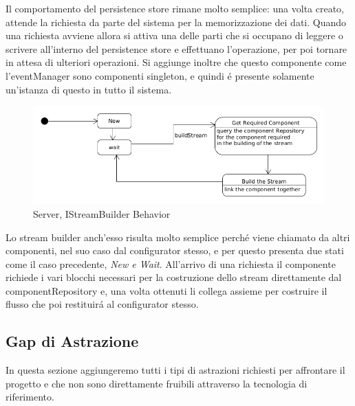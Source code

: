 Il comportamento del persistence store rimane molto semplice: una volta creato, attende la richiesta da parte del sistema per la memorizzazione dei dati.
Quando una richiesta avviene allora si attiva una delle parti che si occupano di leggere o scrivere all'interno del persistence store e effettuano l'operazione, per poi tornare in attesa di ulteriori operazioni. Si aggiunge inoltre che questo componente come l'eventManager sono componenti singleton, e quindi \'e presente solamente un'istanza di questo in tutto il sistema.

\begin{figure}[h]
\centering
\includegraphics[width=\textwidth]{Figures/LogicArchitecture/Server/IStreamBuiderBehavior}
\caption{Server, IStreamBuilder Behavior}
\end{figure}

Lo stream builder anch'esso risulta molto semplice perch\'e viene chiamato da altri componenti, nel suo caso dal configurator stesso, e per questo presenta due stati come il caso precedente, \textit{New e Wait}. All'arrivo di una richiesta il componente richiede i vari blocchi necessari per la costruzione dello stream direttamente dal componentRepository e, una volta ottenuti li collega assieme per costruire il flusso che poi restituir\'a al configurator stesso.

\subsection{Gap di Astrazione}

In questa sezione aggiungeremo tutti i tipi di astrazioni richiesti per affrontare il progetto e che non sono direttamente fruibili attraverso la tecnologia di riferimento.

